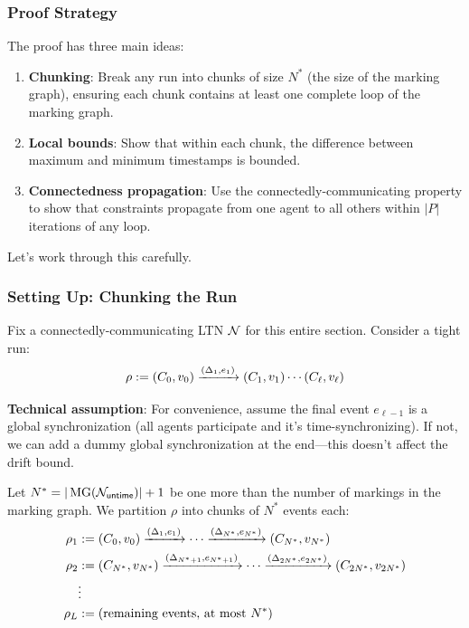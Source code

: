 \subsubsection{Proof Strategy}

The proof has three main ideas:

\begin{enumerate}
\item \textbf{Chunking}: Break any run into chunks of size $N^*$ (the size of the marking graph), ensuring each chunk contains at least one complete loop of the marking graph.

\item \textbf{Local bounds}: Show that within each chunk, the difference between maximum and minimum timestamps is bounded.

\item \textbf{Connectedness propagation}: Use the connectedly-communicating property to show that constraints propagate from one agent to all others within $|P|$ iterations of any loop.
\end{enumerate}

Let's work through this carefully.

\subsubsection{Setting Up: Chunking the Run}

Fix a connectedly-communicating LTN $\mathcal{N}$ for this entire section. Consider a tight run:
\[
\rho:= (C_0, v_0) \xrightarrow{(\Delta_1, e_1)} (C_1, v_1) \cdots (C_\ell, v_\ell)
\]

\textbf{Technical assumption}: For convenience, assume the final event $e_{\ell-1}$ is a global synchronization (all agents participate and it's time-synchronizing). If not, we can add a dummy global synchronization at the end---this doesn't affect the drift bound.

Let $N^* = |\operatorname{MG}(\mathcal{N}_{\mathsf{untime}})| + 1$ be one more than the number of markings in the marking graph. We partition $\rho$ into chunks of $N^*$ events each:
\begin{align*}
    \rho_1 &:= (C_0, v_0) \xrightarrow{(\Delta_1, e_1)} \cdots \xrightarrow{(\Delta_{N^*}, e_{N^*})} (C_{N^*}, v_{N^*}) \\
    \rho_2 &:= (C_{N^*}, v_{N^*}) \xrightarrow{(\Delta_{N^*+1}, e_{N^*+1})} \cdots \xrightarrow{(\Delta_{2N^*}, e_{2N^*})} (C_{2N^*}, v_{2N^*}) \\
    &\vdots \\
    \rho_L &:= \text{(remaining events, at most } N^* \text{)}
\end{align*}

